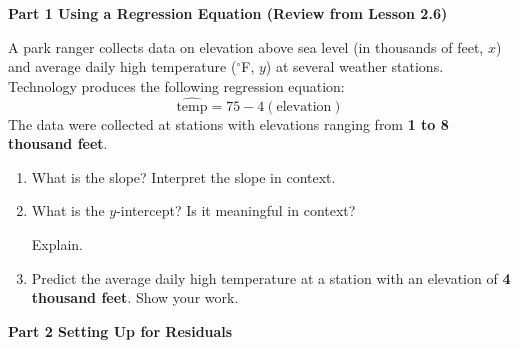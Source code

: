\documentclass[10pt]{article}
\begin{document}
\namedateperiod

\vspace{0.3in}

{\large\bfseries\color{navy} Part 1 \quad Using a Regression Equation (Review from Lesson 2.6)}

\vspace{0.12in}
\noindent A park ranger collects data on elevation above sea level (in thousands of feet, $x$)
and average daily high temperature ($^\circ$F, $y$) at several weather stations. Technology
produces the following regression equation:
\[
  \widehat{\text{temp}} = 75 - 4(\text{elevation})
\]
The data were collected at stations with elevations ranging from \textbf{1 to 8 thousand feet}.

\vspace{0.12in}

\begin{enumerate}[leftmargin=1.6em, itemsep=0.22in]

  \item What is the slope?  \quad Interpret the slope in context.\\[8pt]

  \item What is the $y$-intercept?  \quad Is it meaningful in context? 

        Explain.\\[8pt]

  \item Predict the average daily high temperature at a station with an elevation of
        \textbf{4 thousand feet}. Show your work.\\[8pt]

\end{enumerate}

\vspace{0.22in}

{\large\bfseries\color{navy} Part 2 \quad Setting Up for Residuals}
\end{document}
